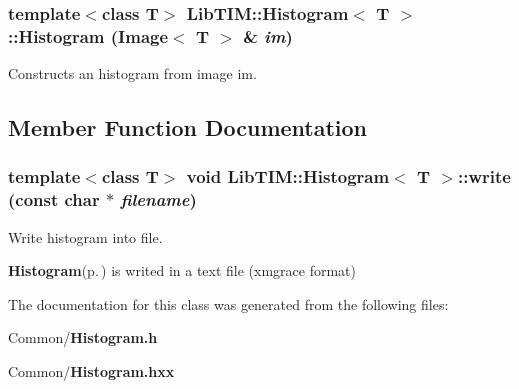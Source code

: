 \subsubsection{\setlength{\rightskip}{0pt plus 5cm}template$<$class T$>$ {\bf Lib\-TIM::Histogram}$<$ T $>$::{\bf Histogram} ({\bf Image}$<$ T $>$ \& {\em im})}\label{classLibTIM_1_1Histogram_a0}


Constructs an histogram from image im. 



\subsection{Member Function Documentation}
\subsubsection{\setlength{\rightskip}{0pt plus 5cm}template$<$class T$>$ void {\bf Lib\-TIM::Histogram}$<$ T $>$::write (const char $\ast$ {\em filename})}\label{classLibTIM_1_1Histogram_a1}


Write histogram into file. 

{\bf Histogram}{\rm (p.\,\pageref{classLibTIM_1_1Histogram})} is writed in a text file (xmgrace format)

The documentation for this class was generated from the following files:\begin{CompactItemize}
\item 
Common/{\bf Histogram.h}\item 
Common/{\bf Histogram.hxx}\end{CompactItemize}
